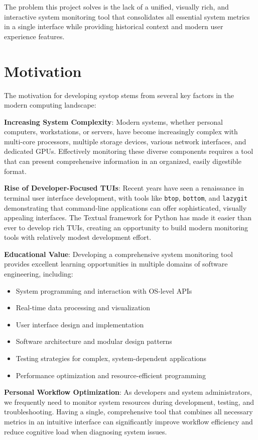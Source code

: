 \documentclass[12pt,a4paper,oneside]{report}
\begin{document}
The problem this project solves is the lack of a unified, visually rich, and interactive system monitoring tool that consolidates all essential system metrics in a single interface while providing historical context and modern user experience features.

\section{Motivation}
\label{sec:motivation}

The motivation for developing systop stems from several key factors in the modern computing landscape:

\textbf{Increasing System Complexity}: Modern systems, whether personal computers, workstations, or servers, have become increasingly complex with multi-core processors, multiple storage devices, various network interfaces, and dedicated GPUs. Effectively monitoring these diverse components requires a tool that can present comprehensive information in an organized, easily digestible format.

\textbf{Rise of Developer-Focused TUIs}: Recent years have seen a renaissance in terminal user interface development, with tools like \texttt{btop}, \texttt{bottom}, and \texttt{lazygit} demonstrating that command-line applications can offer sophisticated, visually appealing interfaces. The Textual framework for Python has made it easier than ever to develop rich TUIs, creating an opportunity to build modern monitoring tools with relatively modest development effort.

\textbf{Educational Value}: Developing a comprehensive system monitoring tool provides excellent learning opportunities in multiple domains of software engineering, including:
\begin{itemize}
    \item System programming and interaction with OS-level APIs
    \item Real-time data processing and visualization
    \item User interface design and implementation
    \item Software architecture and modular design patterns
    \item Testing strategies for complex, system-dependent applications
    \item Performance optimization and resource-efficient programming
\end{itemize}

\textbf{Personal Workflow Optimization}: As developers and system administrators, we frequently need to monitor system resources during development, testing, and troubleshooting. Having a single, comprehensive tool that combines all necessary metrics in an intuitive interface can significantly improve workflow efficiency and reduce cognitive load when diagnosing system issues.
\end{document}
